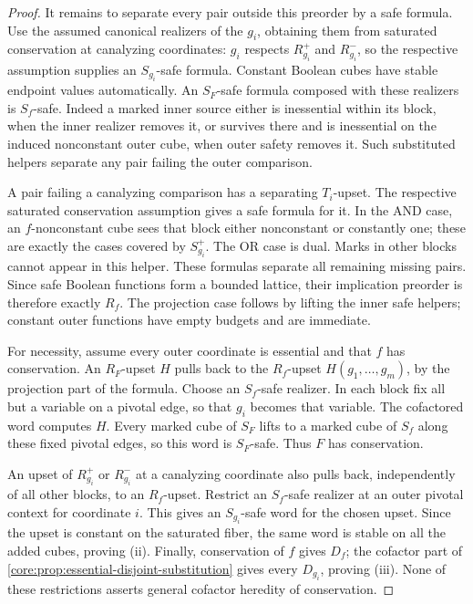 \begin{proof}
It remains to separate every pair outside this preorder by a safe
formula. Use the assumed canonical realizers of the $g_i$, obtaining
them from saturated conservation at canalyzing coordinates: $g_i$
respects $R_{g_i}^+$ and $R_{g_i}^-$, so the respective assumption
supplies an $S_{g_i}$-safe formula. Constant Boolean cubes have stable
endpoint values automatically.
An $S_F$-safe formula composed with these realizers is $S_f$-safe.
Indeed a marked inner source either is inessential within its block,
when the inner realizer removes it, or survives there and is inessential
on the induced nonconstant outer cube, when outer safety removes it.
Such substituted helpers separate any pair failing the outer comparison.

A pair failing a canalyzing comparison has a separating $T_i$-upset.
The respective saturated conservation assumption gives a safe formula
for it. In the AND case, an $f$-nonconstant cube sees that block either
nonconstant or constantly one; these are exactly the cases covered
by $S_{g_i}^+$. The OR case is dual. Marks in other blocks cannot
appear in this helper. These formulas separate all remaining missing pairs.
Since safe Boolean functions form a bounded lattice, their implication
preorder is therefore exactly $R_f$. The projection case follows by
lifting the inner safe helpers; constant outer functions have empty
budgets and are immediate.

For necessity, assume every outer coordinate is essential and that $f$
has conservation. An $R_F$-upset $H$ pulls back to the $R_f$-upset
$H(g_1,\ldots,g_m)$, by the projection part of the formula.
Choose an $S_f$-safe realizer. In each block fix all but a variable
on a pivotal edge, so that $g_i$ becomes that variable. The cofactored
word computes $H$. Every marked cube of $S_F$ lifts to a marked cube
of $S_f$ along these fixed pivotal edges, so this word is $S_F$-safe.
Thus $F$ has conservation.

An upset of $R_{g_i}^+$ or $R_{g_i}^-$ at a canalyzing coordinate
also pulls back, independently of all other blocks, to an $R_f$-upset.
Restrict an $S_f$-safe realizer at an outer pivotal context for coordinate
$i$. This gives an $S_{g_i}$-safe word for the chosen upset. Since
the upset is constant on the saturated fiber, the same word is stable
on all the added cubes, proving (ii). Finally, conservation of $f$
gives $D_f$; the cofactor part of
\cref{core:prop:essential-disjoint-substitution} gives every $D_{g_i}$,
proving (iii). None of these restrictions asserts general cofactor
heredity of conservation.
\end{proof}


